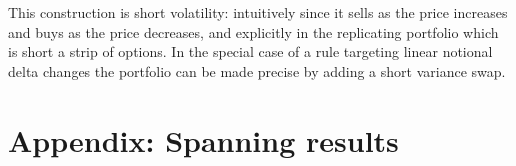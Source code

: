 \documentclass[12pt]{article}
\begin{document}
This construction is short volatility: intuitively since it sells as the price increases and buys as the price decreases, and explicitly in the replicating portfolio which is short a strip of options. In the special case of a rule targeting linear notional delta changes the portfolio can be made precise by adding a short variance swap.







\singlespacing
\setlength\bibsep{0pt}





\clearpage

\onehalfspacing










\clearpage

\section*{Appendix: Spanning results  } \label{sec:appendixa}
\end{document}
